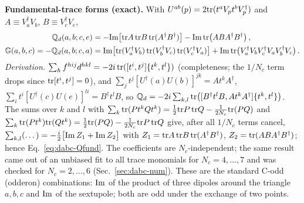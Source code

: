 \documentclass[10pt]{article}
\def\mf#1{\mathbb{#1}}
\begin{document}
\noindent\textbf{Fundamental-trace forms (exact).} With $U^{ab}(p)=2{\rm tr}(t^{a}V_{p}t^{b}V_{p}^{\dagger})$ and $A\equiv V_{a}^{\dagger}V_{b}$, $B\equiv V_{c}^{\dagger}V_{e}$,
\begin{align}
\mf{Q}_{d}(a,b;c,e)&=-{\rm Im}\big[{\rm tr}A\,{\rm tr}B\,{\rm tr}(A^{\dagger}B^{\dagger})\big]-{\rm Im}\,{\rm tr}\big(ABA^{\dagger}B^{\dagger}\big)\,,\label{eq:dabc-Qfund}\\
\mf{G}(a,b,c)=-\mf{Q}_{d}(a,b;c,a)&={\rm Im}\big[{\rm tr}(V_{a}^{\dagger}V_{b})\,{\rm tr}(V_{b}^{\dagger}V_{c})\,{\rm tr}(V_{c}^{\dagger}V_{a})\big]+{\rm Im}\,{\rm tr}\big(V_{a}^{\dagger}V_{b}V_{c}^{\dagger}V_{a}V_{b}^{\dagger}V_{c}\big)\,.\label{eq:dabc-Gfund}
\end{align}
\emph{Derivation.} $\sum_{h}f^{hij}d^{hkl}=-2i\,{\rm tr}([t^{i},t^{j}]\{t^{k},t^{l}\})$ (completeness; the $1/N_{c}$ term drops since ${\rm tr}[t^{i},t^{j}]=0$), and $\sum_{j}t^{j}[U^{\dagger}(a)U(b)]^{jk}=At^{k}A^{\dagger}$, $\sum_{i}t^{i}[U^{\dagger}(c)U(e)]^{li}=B^{\dagger}t^{l}B$, so $\mf{Q}_{d}=-2i\sum_{k,l}{\rm tr}\big([B^{\dagger}t^{l}B,At^{k}A^{\dagger}]\{t^{k},t^{l}\}\big)$. The sums over $k$ and $l$ with $\sum_{k}{\rm tr}(Pt^{k}Qt^{k})=\frac12{\rm tr}P\,{\rm tr}Q-\frac{1}{2N_{c}}{\rm tr}(PQ)$ and $\sum_{k}{\rm tr}(Pt^{k}){\rm tr}(Qt^{k})=\frac12{\rm tr}(PQ)-\frac{1}{2N_{c}}{\rm tr}P\,{\rm tr}Q$ give, after all $1/N_{c}$ terms cancel, $\sum_{k,l}(\dots)=-\frac{i}{2}\big[{\rm Im}\,Z_{1}+{\rm Im}\,Z_{2}\big]$ with $Z_{1}={\rm tr}A\,{\rm tr}B\,{\rm tr}(A^{\dagger}B^{\dagger})$, $Z_{2}={\rm tr}(ABA^{\dagger}B^{\dagger})$; hence Eq.~\eqref{eq:dabc-Qfund}. The coefficients are $N_{c}$-independent; the same result came out of an unbiased fit to all trace monomials for $N_{c}=4,\dots,7$ and was checked for $N_{c}=2,\dots,6$ (Sec.~\ref{sec:dabc-num}). These are the standard C-odd (odderon) combinations: ${\rm Im}$ of the product of three dipoles around the triangle $a,b,c$ and ${\rm Im}$ of the sextupole; both are odd under the exchange of two points.
\end{document}
